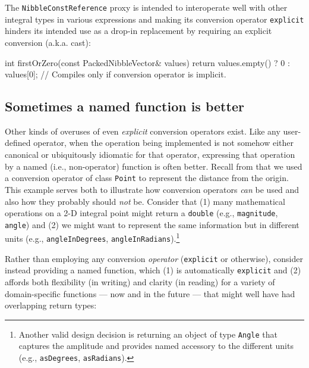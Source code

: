 \noindent The \lstinline!NibbleConstReference! proxy is intended to interoperate well with other integral types in various expressions and making its conversion operator \lstinline!explicit! hinders its intended use as a drop-in replacement by requiring an explicit conversion (a.k.a. cast):

\begin{emcppslisting}
int firstOrZero(const PackedNibbleVector& values)
{
    return values.empty() 
        ? 0 
        : values[0]; // Compiles only if conversion operator is implicit.
}
\end{emcppslisting}


\subsection[Sometimes a named function is better]{Sometimes a named function is better}\label{sometimes-a-named-function-is-better}

Other kinds of overuses of even \emph{explicit} conversion
operators exist. Like any user-defined operator, when the operation being
implemented is not somehow either canonical or ubiquitously idiomatic
for that operator, expressing that operation by a
named (i.e., non-operator) function is often better. Recall from  
that we used a conversion operator of
class \lstinline!Point! to represent the distance from the origin. This
example serves both to illustrate how conversion operators \emph{can} be
used and also how they probably should \emph{not} be. Consider that (1)
many mathematical operations on a 2-D integral point might return a \lstinline!double! (e.g., \lstinline!magnitude!,
\lstinline!angle!) and (2) we might want to represent the same
information but in different units (e.g., \lstinline!angleInDegrees!,
\lstinline!angleInRadians!).{\cprotect\footnote{Another valid design
decision is returning an object of type \lstinline!Angle! that captures
the amplitude and provides named accessory to the different units
  (e.g., \lstinline!asDegrees!, \lstinline!asRadians!).}}

Rather than employing any conversion \emph{operator} (\lstinline!explicit!
or otherwise), consider instead providing a named function, which (1) is
automatically \lstinline!explicit! and (2) affords both flexibility (in
writing) and clarity (in reading) for a variety of domain-specific
functions --- now and in the future --- that might well have had
overlapping return types:

